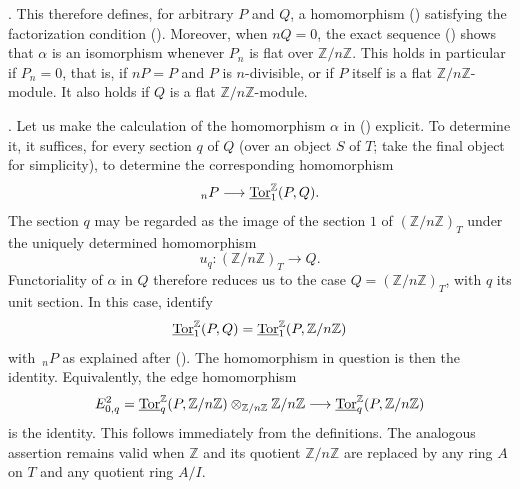 . This therefore defines, for arbitrary $P$ and $Q$, a
homomorphism () satisfying the factorization condition ().
Moreover, when $nQ=0$, the exact sequence () shows that $\alpha$
is an isomorphism whenever $P_n$ is flat over
$\mathbb Z/n\mathbb Z$.  This holds in particular if $P_n=0$, that
is, if $nP=P$ and $P$ is $n$-divisible, or if $P$ itself is a flat
$\mathbb Z/n\mathbb Z$-module.  It also holds if $Q$ is a flat
$\mathbb Z/n\mathbb Z$-module.

. Let us make the calculation of the homomorphism $\alpha$ in
() explicit.  To determine it, it suffices, for every section
$q$ of $Q$ (over an object $S$ of $T$; take the final object for
simplicity), to determine the corresponding homomorphism
\[
 {}_nP\longrightarrow\uTor^{\mathbb Z}_1(P,Q).
\]
The section $q$ may be regarded as the image of the section $1$ of
$(\mathbb Z/n\mathbb Z)_T$ under the uniquely determined
homomorphism
\[
 u_q:(\mathbb Z/n\mathbb Z)_T\longrightarrow Q.
\]
Functoriality of $\alpha$ in $Q$ therefore reduces us to the case
$Q=(\mathbb Z/n\mathbb Z)_T$, with $q$ its unit section.  In this
case, identify
\[
 \uTor^{\mathbb Z}_1(P,Q)
 =
 \uTor^{\mathbb Z}_1(P,\mathbb Z/n\mathbb Z)
\]
with $\,{}_nP$ as explained after ().  The homomorphism in question
is then the identity.  Equivalently, the edge homomorphism
\[
 E^2_{0,q}
 =
 \uTor^{\mathbb Z}_q(P,\mathbb Z/n\mathbb Z)
 \otimes_{\mathbb Z/n\mathbb Z}\mathbb Z/n\mathbb Z
 \longrightarrow
 \uTor^{\mathbb Z}_q(P,\mathbb Z/n\mathbb Z)
\]
is the identity.  This follows immediately from the definitions.
The analogous assertion remains valid when $\mathbb Z$ and its
quotient $\mathbb Z/n\mathbb Z$ are replaced by any ring $A$ on $T$
and any quotient ring $A/I$.

